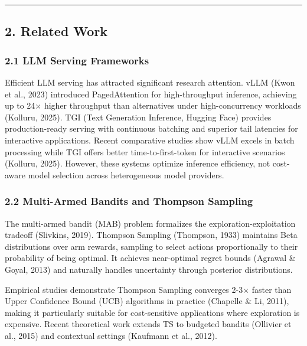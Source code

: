 \documentclass[
]{article}
\begin{document}
\begin{center}\rule{0.5\linewidth}{0.5pt}\end{center}

\hypertarget{related-work}{%
\subsection{2. Related Work}\label{related-work}}

\hypertarget{llm-serving-frameworks}{%
\subsubsection{2.1 LLM Serving
Frameworks}\label{llm-serving-frameworks}}

Efficient LLM serving has attracted significant research attention. vLLM
(Kwon et al., 2023) introduced PagedAttention for high-throughput
inference, achieving up to 24× higher throughput than alternatives under
high-concurrency workloads (Kolluru, 2025). TGI (Text Generation
Inference, Hugging Face) provides production-ready serving with
continuous batching and superior tail latencies for interactive
applications. Recent comparative studies show vLLM excels in batch
processing while TGI offers better time-to-first-token for interactive
scenarios (Kolluru, 2025). However, these systems optimize inference
efficiency, not cost-aware model selection across heterogeneous model
providers.

\hypertarget{multi-armed-bandits-and-thompson-sampling}{%
\subsubsection{2.2 Multi-Armed Bandits and Thompson
Sampling}\label{multi-armed-bandits-and-thompson-sampling}}

The multi-armed bandit (MAB) problem formalizes the
exploration-exploitation tradeoff (Slivkins, 2019). Thompson Sampling
(Thompson, 1933) maintains Beta distributions over arm rewards, sampling
to select actions proportionally to their probability of being optimal.
It achieves near-optimal regret bounds (Agrawal \& Goyal, 2013) and
naturally handles uncertainty through posterior distributions.

Empirical studies demonstrate Thompson Sampling converges 2-3× faster
than Upper Confidence Bound (UCB) algorithms in practice (Chapelle \&
Li, 2011), making it particularly suitable for cost-sensitive
applications where exploration is expensive. Recent theoretical work
extends TS to budgeted bandits (Ollivier et al., 2015) and contextual
settings (Kaufmann et al., 2012).
\end{document}
